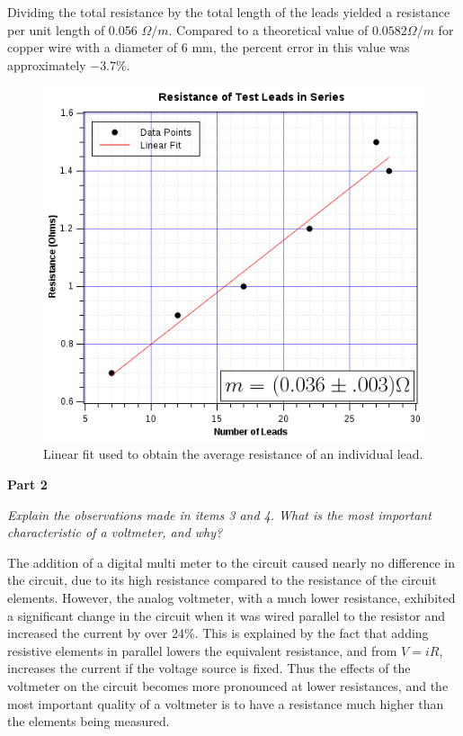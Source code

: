 \documentclass[twocolumn,english]{IEEEtran}
\theoremstyle{plain}
\theoremstyle{plain}
\begin{document}
Dividing the total resistance by the total length of the leads yielded a resistance per unit length of 0.056 $\Omega/m$. Compared to a theoretical value of $0.0582 \Omega/m$ for copper wire with a diameter of 6 mm, the percent error in this value was approximately $-3.7\%$.
\begin{figure}[H]
  \begin{centering}
  \begin{center}
  \includegraphics[width=\linewidth]{./lead_resistance.png}
  \caption{Linear fit used to obtain the average resistance of an individual lead.}
  \label{fig:lead_resistance}
  \end{center}
  \par\end{centering}
  \end{figure}

\textbf{Part 2}

\textit{Explain the observations made in items 3 and 4. What is the most important characteristic of a voltmeter, and why?}

The addition of a digital multi meter to the circuit caused nearly no difference in the circuit, due to its high resistance compared to the resistance of the circuit elements. However, the analog voltmeter, with a much lower resistance, exhibited a significant change in the circuit when it was wired parallel to the resistor and increased the current by over 24\%.
This is explained by the fact that adding resistive elements in parallel lowers the equivalent resistance, and from $V=iR$, increases the current if the voltage source is fixed.
Thus the effects of the voltmeter on the circuit becomes more pronounced at lower resistances, and the most important quality of a voltmeter is to have a resistance much higher than the elements being measured. \\
\end{document}

